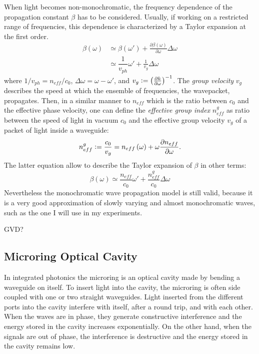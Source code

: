 When light becomes non-monochromatic, the frequency dependence of the propagation constant $\beta$ has to be considered.
Usually, if working on a restricted range of frequencies, this dependence is characterized by a Taylor expansion at the first order.
\begin{subequations}
\begin{align}
	\beta\left(\omega\right)
		&\simeq \beta\left(\omega'\right) + \frac{\partial \beta\left(\omega\right) }{\partial \omega} \Delta\omega \label{eq:beta_taylor}\\
		&\simeq \dfrac{1}{v_{ph}} \omega' + \frac{1}{v_g} \Delta\omega \label{eq:beta_taylor_v}
\end{align}
\end{subequations}
where $1/v_{ph} = n_{eff}/c_0$, $\Delta\omega = \omega-\omega'$, and $v_g \vcentcolon= \left( \frac{\partial k}{\partial \omega}\right)^{-1}$.
The \textit{group velocity} $v_g$ describes the speed at which the ensemble of frequencies, the wavepacket, propagates.
Then, in a similar manner to $n_{eff}$ which is the ratio between $c_0$ and the effective phase velocity, one can define the \textit{effective group index} $n_{eff}^g$ as ratio between the speed of light in vacuum $c_0$ and the effective group velocity $v_g$ of a packet of light inside a waveguide:
\begin{equation}
	n_{eff}^g \vcentcolon= \dfrac{c_0}{v_g} = n_{eff}\left( \omega \right) +\omega\dfrac{\partial n_{eff}}{\partial \omega}.
	\label{eq:neff_group}
\end{equation}
The latter equation allow to describe the Taylor expansion of $\beta$ in other terms:
\begin{equation}
	\beta\left(\omega\right) \simeq \frac{n_{eff}}{c_0}\omega' + \frac{n_{eff}^g}{c_0} \Delta\omega
	\label{eq:beta_taylor_n}
\end{equation}
Nevertheless the monochromatic wave propagation model is still valid, because it is a very good approximation of slowly varying and almost monochromatic waves, such as the one I will use in my experiments.

\LARGE GVD? \normalsize

\subsection{Microring Optical Cavity}
\label{ssec:Microring_Optical_Cavity}
In integrated photonics the microring is an optical cavity made by bending a waveguide on itself.
To insert light into the cavity, the microring is often side coupled with one or two straight waveguides.
Light inserted from the different ports into the cavity interfere with itself, after a round trip, and with each other.
When the waves are in phase, they generate constructive interference and the energy stored in the cavity increases exponentially.
On the other hand, when the signals are out of phase, the interference is destructive and the energy stored in the cavity remains low.

